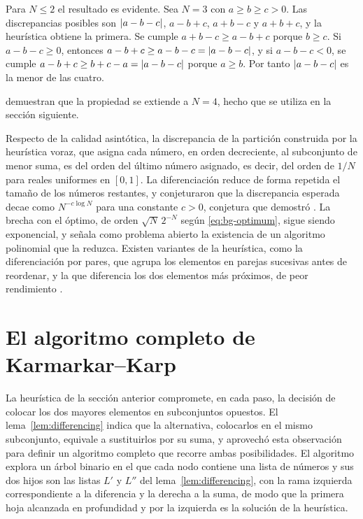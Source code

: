 \begin{demostracion}
Para $N \leq 2$ el resultado es evidente. Sea $N = 3$ con $a \geq b \geq c > 0$. Las discrepancias posibles son $\left\lvert a - b - c \right\rvert$, $a - b + c$, $a + b - c$ y $a + b + c$, y la heurística obtiene la primera. Se cumple $a + b - c \geq a - b + c$ porque $b \geq c$. Si $a - b - c \geq 0$, entonces $a - b + c \geq a - b - c = \left\lvert a - b - c \right\rvert$, y si $a - b - c < 0$, se cumple $a - b + c \geq b + c - a = \left\lvert a - b - c \right\rvert$ porque $a \geq b$. Por tanto $\left\lvert a - b - c \right\rvert$ es la menor de las cuatro.
\end{demostracion}

\textcite{gent1998} demuestran que la propiedad se extiende a $N = 4$, hecho que se utiliza en la sección siguiente.

Respecto de la calidad asintótica, la discrepancia de la partición construida por la heurística voraz, que asigna cada número, en orden decreciente, al subconjunto de menor suma, es del orden del último número asignado, es decir, del orden de $1/N$ para reales uniformes en $[0,1]$. La diferenciación reduce de forma repetida el tamaño de los números restantes, y \textcite{karmarkar1982} conjeturaron que la discrepancia esperada decae como $N^{-c\log N}$ para una constante $c > 0$, conjetura que demostró \textcite{yakir1996}. La brecha con el óptimo, de orden $\sqrt{N}\,2^{-N}$ según \eqref{eq:bg-optimum}, sigue siendo exponencial, y \textcite{mertens2006} señala como problema abierto la existencia de un algoritmo polinomial que la reduzca. Existen variantes de la heurística, como la diferenciación por pares, que agrupa los elementos en parejas sucesivas antes de reordenar, y la que diferencia los dos elementos más próximos, de peor rendimiento \parencite{gent1998}.

\section{El algoritmo completo de Karmarkar--Karp}\label{sec:bg-ckk}

La heurística de la sección anterior compromete, en cada paso, la decisión de colocar los dos mayores elementos en subconjuntos opuestos. El lema~\ref{lem:differencing} indica que la alternativa, colocarlos en el mismo subconjunto, equivale a sustituirlos por su suma, y \textcite{korf1998} aprovechó esta observación para definir un algoritmo completo que recorre ambas posibilidades. El algoritmo explora un árbol binario en el que cada nodo contiene una lista de números y sus dos hijos son las listas $L'$ y $L''$ del lema~\ref{lem:differencing}, con la rama izquierda correspondiente a la diferencia y la derecha a la suma, de modo que la primera hoja alcanzada en profundidad y por la izquierda es la solución de la heurística.

